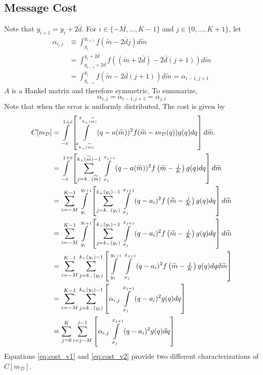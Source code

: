 \documentclass[12pt]{article}
\begin{document}
\subsection{Message Cost}
Note that $y_{i+1}=y_{i}+2\bar{d}$. For $i\in\{-M,\ldots,K-1\}$ and $j\in\{0,\ldots,K+1\}$, let
\begin{align}
	\alpha_{i,j}&\equiv\int_{y_{i}}^{y_{i+1}}{f(\widetilde{m}-2\bar{d}j)d\widetilde{m}}\label{eq:alpha}\\
	&=\int_{y_{i-1}+2\bar{d}}^{y_{i}+2\bar{d}}{f((\widetilde{m}+2\bar{d})-2\bar{d}(j+1))d\widetilde{m}}\\
	&=\int_{y_{i-1}}^{y_{i}}{f(\widetilde{m}-2\bar{d}(j+1))d\widetilde{m}}=\alpha_{i-1,j+1}
\end{align}
$A$ is a Hankel matrix and therefore symmetric. To summarize,
\begin{equation}
	\alpha_{i,j}=\alpha_{i-1,j+1}=\alpha_{j,i}
\end{equation}
Note that when the error is uniformly distributed, The cost is given by 
\begin{align}
	C[m_{\mathcal{D}}]&=\int\displaylimits_{-\bar{e}}^{1+\bar{e}}{\left[\int\displaylimits_{x_{k_{-}(\widetilde{m})}}^{x_{k_{+}(\widetilde{m})}}{(q-a(\widetilde{m}))^{2}f(\widetilde{m}-m_{\mathcal{D}}(q))g(q)dq}\right]d\widetilde{m}}.\\
	&=\int\displaylimits_{-\bar{e}}^{1+\bar{e}}{\left[\sum_{j=k_{-}(\widetilde{m})}^{k_{+}(\widetilde{m})-1}{\int\displaylimits_{x_{j}}^{x_{j+1}}{(q-a(\widetilde{m}))^{2}f\left(\widetilde{m}-\tfrac{j}{K}\right)g(q)dq}}\right]d\widetilde{m}}\\
	&=\sum_{i=-M}^{K-1}{\int\displaylimits_{y_{i}}^{y_{i+1}}{\left[\sum_{j=k_{-}(y_{i})}^{k_{+}(y_{i})-1}{\int\displaylimits_{x_{j}}^{x_{j+1}}{(q-a_{i})^{2}f\left(\widetilde{m}-\tfrac{j}{K}\right)g(q)dq}}\right]d\widetilde{m}}}\\
	&=\sum_{i=-M}^{K-1}{\int\displaylimits_{y_{i}}^{y_{i+1}}{\left[\sum_{j=k_{-}(y_{i})}^{k_{+}(y_{i})-1}{\int\displaylimits_{x_{j}}^{x_{j+1}}{(q-a_{i})^{2}f\left(\widetilde{m}-\tfrac{j}{K}\right)g(q)dq}}\right]d\widetilde{m}}}\\
	&=\sum_{i=-M}^{K-1}{\sum_{j=k_{-}(y_{i})}^{k_{+}(y_{i})-1}{\left[\int\displaylimits_{y_{i}}^{y_{i+1}}{\:\int\displaylimits_{x_{j}}^{x_{j+1}}{(q-a_{i})^{2}f\left(\widetilde{m}-\tfrac{j}{K}\right)g(q)dq}}d\widetilde{m}\right]}}\\
	&=\sum_{i=-M}^{K-1}{\sum_{j=k_{-}(y_{i})}^{k_{+}(y_{i})-1}{\left[\alpha_{i,j}\int\displaylimits_{x_{j}}^{x_{j+1}}{(q-a_{i})^{2}g(q)dq}\right]}}\label{eq:cost_v1}\\
	&=\sum_{j=0}^{K}{\sum_{i=j-M}^{j-1}{\left[\alpha_{i,j}\int\displaylimits_{x_{j}}^{x_{j+1}}{(q-a_{i})^{2}g(q)dq}\right]}}\label{eq:cost_v2}
\end{align}
Equations \ref{eq:cost_v1} and \ref{eq:cost_v2} provide two different characterizations of $C[m_{\mathcal{D}}]$.
\end{document}
